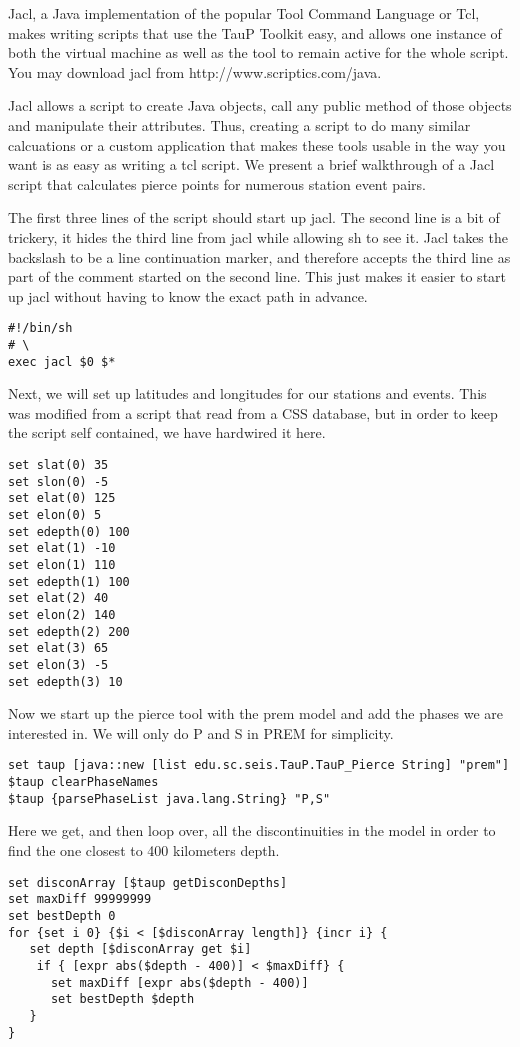 Jacl, a Java implementation of the popular Tool Command Language or Tcl,
makes writing scripts that use the TauP Toolkit easy, and allows one
instance of both the
virtual machine as well as the tool to remain active for the whole script.
You may download jacl from http://www.scriptics.com/java.

Jacl allows a script to create Java objects, call any public method of
those objects and manipulate their attributes. Thus, creating a script
to do many similar calcuations or a custom application that makes these tools
usable in the way you want is as easy as writing a tcl script. We present a
brief walkthrough of a Jacl script that calculates pierce points for
numerous station event pairs.

The first three lines of the script should start up jacl. The second line is
a bit of trickery, it hides the third line from jacl while allowing sh to see
it. Jacl takes the backslash to be a line continuation marker, and therefore
accepts the third line as part of the comment started on the second line.
This just makes it easier to start up jacl without having to know the exact
path in advance.

\begin{verbatim}
#!/bin/sh
# \
exec jacl $0 $*
\end{verbatim}

Next, we will set up latitudes and longitudes for our stations and events.
This was modified from a script that read from a CSS database, but in
order to keep the script self contained, we have hardwired it here.
\begin{verbatim}
set slat(0) 35
set slon(0) -5
set elat(0) 125
set elon(0) 5
set edepth(0) 100
set elat(1) -10
set elon(1) 110
set edepth(1) 100
set elat(2) 40
set elon(2) 140
set edepth(2) 200
set elat(3) 65
set elon(3) -5
set edepth(3) 10
\end{verbatim}

Now we start up the pierce tool with the prem model
 and add the phases we are interested in. We will
only do P and S in PREM for simplicity.
\begin{verbatim}
set taup [java::new [list edu.sc.seis.TauP.TauP_Pierce String] "prem"]
$taup clearPhaseNames
$taup {parsePhaseList java.lang.String} "P,S"
\end{verbatim}

Here we get, and then loop over, all the discontinuities in the model in order
to find the one closest to 400 kilometers depth.
\begin{verbatim}
set disconArray [$taup getDisconDepths]
set maxDiff 99999999
set bestDepth 0
for {set i 0} {$i < [$disconArray length]} {incr i} {
   set depth [$disconArray get $i]
	if { [expr abs($depth - 400)] < $maxDiff} {
      set maxDiff [expr abs($depth - 400)]
      set bestDepth $depth
   }
}
\end{verbatim}

